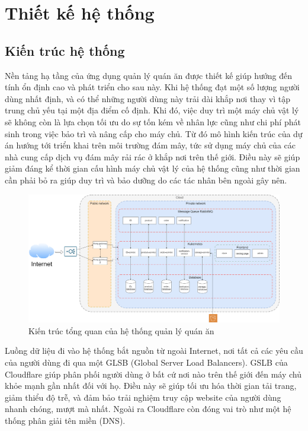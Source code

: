 \chapter{Thiết kế hệ thống}\label{chap2}
\section{Kiến trúc hệ thống}\label{sec:system-architecture}
Nền tảng hạ tầng của ứng dụng quản lý quán ăn được thiết kế giúp hướng đến tính ổn định cao và phát triển cho sau này.
Khi hệ thống đạt một số lượng người dùng nhất định, và có thể những người dùng này trải dài khắp nơi thay vì tập trung chủ yếu tại một địa điểm cố định.
Khi đó, việc duy trì một máy chủ vật lý sẽ không còn là lựa chọn tối ưu do sự tốn kém về nhân lực cũng như chi phí phát sinh trong việc bảo trì và nâng cấp cho máy chủ.
Từ đó mô hình kiến trúc của dự án hướng tới triển khai trên môi trường đám mây, tức sử dụng máy chủ của các nhà cung cấp dịch vụ đám mây rải rác ở khắp nơi trên thế giới.
Điều này sẽ giúp giảm đáng kể thời gian cấu hình máy chủ vật lý của hệ thống cũng như thời gian cần phải bỏ ra giúp duy trì và bảo dưỡng do các tác nhân bên ngoài gây nên.

\begin{figure}[h]
	\centering
	\includegraphics[width=1\textwidth]{images/hChip/overall-architecture.png}
	\caption{Kiến trúc tổng quan của hệ thống quản lý quán ăn}
	\label{fig:overall-architecture}
\end{figure}

Luồng dữ liệu đi vào hệ thống bắt nguồn từ ngoài Internet, nơi tất cả các yêu cầu của người dùng đi qua một GLSB (Global Server Load Balancers).
GSLB của Cloudflare giúp phân phối người dùng ở bất cứ nơi nào trên thế giới đến máy chủ khỏe mạnh gần nhất đối với họ.
Điều này sẽ giúp tối ưu hóa thời gian tải trang, giảm thiểu độ trễ, và đảm bảo trải nghiệm truy cập website của người dùng nhanh chóng, mượt mà nhất.
Ngoài ra Cloudflare còn đóng vai trò như một hệ thống phân giải tên miền (DNS).

